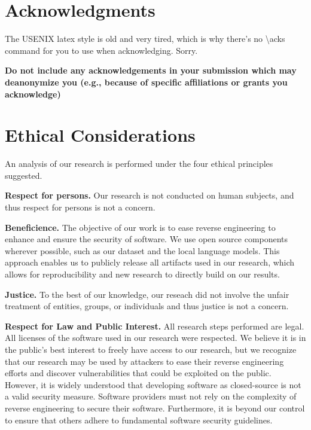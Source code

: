 \section*{Acknowledgments}

The USENIX latex style is old and very tired, which is why
there's no \textbackslash{}acks command for you to use when
acknowledging. Sorry.

\textbf{Do not include any acknowledgements in your submission which may deanonymize you (e.g., because of specific affiliations or grants you acknowledge)}

\cleardoublepage
\appendix
\section*{Ethical Considerations}

An analysis of our research is performed under the four ethical principles suggested.

\noindent \textbf{Respect for persons.} Our research is not conducted on human subjects, and thus respect for persons is not a concern.

\noindent \textbf{Beneficience.} The objective of our work is to ease reverse engineering to enhance and ensure the security of software. We
use open source components wherever possible, such as our dataset and the local language models. This approach enables us to publicly release
all artifacts used in our research, which allows for reproducibility and new research to directly build on our results.

\noindent \textbf{Justice.} To the best of our knowledge, our reseach did not involve the unfair treatment of entities, groups, or individuals
and thus justice is not a concern.

\noindent \textbf{Respect for Law and Public Interest.} All research steps performed are legal. All licenses of the software used in our research were
respected. We believe it is in the public's best interest to freely have access to our research, but we recognize that our research may be used by attackers
to ease their reverse engineering efforts and discover vulnerabilities that could be exploited on the public. However, it is widely understood that
developing software as closed-source is not a valid security measure. Software providers must not rely on the complexity of reverse engineering to
secure their software. Furthermore, it is beyond our control to ensure that others adhere to fundamental software security guidelines.


